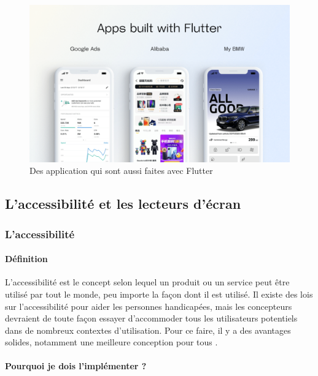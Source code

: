 \begin{figure}[!htbp]
    \centering
    \includegraphics[width=.8\linewidth]{assets/flutter/example-apps-built-with-flutter.png}
    \caption{Des application qui sont aussi faites avec Flutter}
\end{figure}

\FloatBarrier

\subsection{L'accessibilité et les lecteurs d'écran}

\subsubsection{L'accessibilité}

\paragraph{Définition}

L’accessibilité est le concept selon lequel un produit ou un service peut être utilisé par tout le monde, peu importe la façon dont il est utilisé. Il existe des lois sur l’accessibilité pour aider les personnes handicapées, mais les concepteurs devraient de toute façon essayer d’accommoder tous les utilisateurs potentiels dans de nombreux contextes d’utilisation. Pour ce faire, il y a des avantages solides, notamment une meilleure conception pour tous \cite{what-is-accessibility}.

\paragraph{Pourquoi je dois l'implémenter ?}

